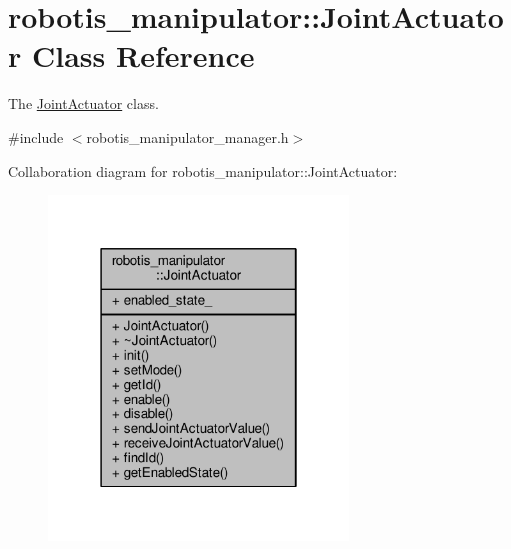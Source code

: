 \hypertarget{classrobotis__manipulator_1_1_joint_actuator}{}\section{robotis\+\_\+manipulator\+:\+:Joint\+Actuator Class Reference}
\label{classrobotis__manipulator_1_1_joint_actuator}


The \hyperlink{classrobotis__manipulator_1_1_joint_actuator}{Joint\+Actuator} class.  




{\ttfamily \#include $<$robotis\+\_\+manipulator\+\_\+manager.\+h$>$}



Collaboration diagram for robotis\+\_\+manipulator\+:\+:Joint\+Actuator\+:\nopagebreak
\begin{figure}[H]
\begin{center}
\leavevmode
\includegraphics[width=226pt]{classrobotis__manipulator_1_1_joint_actuator__coll__graph}
\end{center}
\end{figure}
